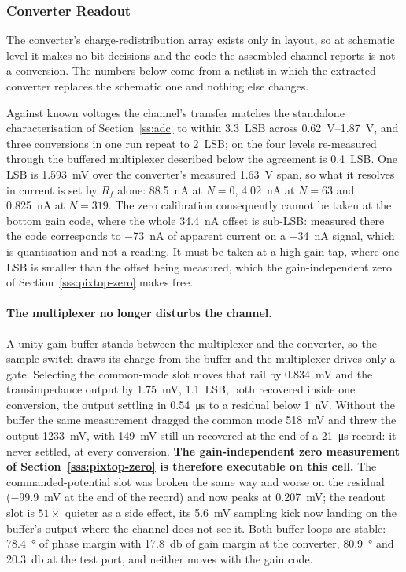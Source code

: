 \subsubsection{Converter Readout}\label{sss:pixtop-adc}

The converter's charge-redistribution array exists only in layout, so at
schematic level it makes no bit decisions and the code the assembled channel
reports is not a conversion. The numbers below come from a netlist in which the
extracted converter replaces the schematic one and nothing else changes.

Against known voltages the channel's transfer matches the standalone
characterisation of Section~\ref{ss:adc} to within \SI{3.3}{LSB} across
\SIrange{0.62}{1.87}{\volt}, and three conversions in one run repeat to
\SI{2}{LSB}; on the four levels re-measured through the buffered multiplexer
described below the agreement is \SI{0.4}{LSB}. One LSB is
\SI{1.593}{\milli\volt} over the converter's measured
\SI{1.63}{\volt} span, so what it resolves in current is set by \(R_f\) alone:
\SI{88.5}{\nano\ampere} at \(N = 0\), \SI{4.02}{\nano\ampere} at \(N = 63\) and
\SI{0.825}{\nano\ampere} at \(N = 319\). The zero calibration consequently
cannot be taken at the bottom gain code, where the whole
\SI{34.4}{\nano\ampere} offset is sub-LSB: measured there the code corresponds
to \SI{-73}{\nano\ampere} of apparent current on a \SI{-34}{\nano\ampere}
signal, which is quantisation and not a reading. It must be taken at a
high-gain tap, where one LSB is smaller than the offset being measured, which
the gain-independent zero of Section~\ref{sss:pixtop-zero} makes free.

\paragraph{The multiplexer no longer disturbs the channel.} A unity-gain buffer
stands between the multiplexer and the converter, so the sample switch draws its
charge from the buffer and the multiplexer drives only a gate. Selecting the
common-mode slot moves that rail by \SI{0.834}{\milli\volt} and the
transimpedance output by \SI{1.75}{\milli\volt}, \SI{1.1}{LSB}, both
recovered inside one conversion, the output settling in
\SI{0.54}{\micro\second} to a residual below \SI{1}{\nano\volt}. Without the
buffer the same measurement dragged the common mode \SI{518}{\milli\volt} and
threw the output \SI{1233}{\milli\volt}, with \SI{149}{\milli\volt} still
un-recovered at the end of a \SI{21}{\micro\second} record: it never settled, at
every conversion. \textbf{The gain-independent zero measurement of
Section~\ref{sss:pixtop-zero} is therefore executable on this cell.} The
commanded-potential slot was broken the same way and worse on the residual
(\SI{-99.9}{\milli\volt} at the end of the record) and now peaks at
\SI{0.207}{\milli\volt}; the readout slot is \(51\times\) quieter as a side
effect, its \SI{5.6}{\milli\volt} sampling kick now landing on the buffer's
output where the channel does not see it. Both buffer loops are stable:
\SI{78.4}{\degree} of phase margin with \SI{17.8}{\decibel} of gain margin at
the converter, \SI{80.9}{\degree} and \SI{20.3}{\decibel} at the test port, and
neither moves with the gain code.

